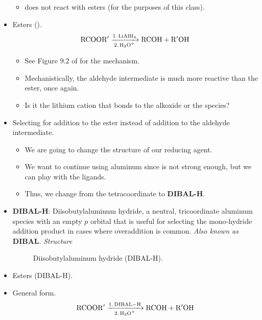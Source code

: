 \documentclass[../notes.tex]{subfiles}
\begin{document}
\begin{itemize}
    \begin{itemize}
        \item {} does not react with esters (for the purposes of this class).
    \end{itemize}
    \item Esters ().
    \begin{equation*}
        \ce{RCOOR$'$ ->[1. LiAlH4][2. H3O+] RCOH + R$'$OH}
    \end{equation*}
    \begin{itemize}
        \item See Figure 9.2 of \textcite{bib:CHEM22100Notes} for the mechanism.
        \item Mechanistically, the aldehyde intermediate is much more reactive than the ester, once again.
        \item Is it the lithium cation that bonds to the alkoxide or the  species?
    \end{itemize}
    \item Selecting for addition to the ester instead of addition to the aldehyde intermediate.
    \begin{itemize}
        \item We are going to change the structure of our reducing agent.
        \item We want to continue using aluminum since  is not strong enough, but we can play with the ligands.
        \item Thus, we change from the tetracoordinate  to \textbf{DIBAL-H}.
    \end{itemize}
    \item \textbf{DIBAL-H}: Diisobutylaluminum hydride, a neutral, tricoordinate aluminum species with an empty $p$ orbital that is useful for selecting the mono-hydride addition product in cases where overaddition is common. \emph{Also known as} \textbf{DIBAL}. \emph{Structure}
    \begin{figure}[h!]
        \centering
        \footnotesize
        \caption{Diisobutylaluminum hydride (DIBAL-H).}
        \label{fig:DIBAL}
    \end{figure}
    \item Esters (DIBAL-H).
    \item General form.
    \begin{equation*}
        \ce{RCOOR$'$ ->[1. DIBAL-H][2. H3O+] RCOH + R$'$OH}
    \end{equation*}

\end{itemize}
\end{document}
